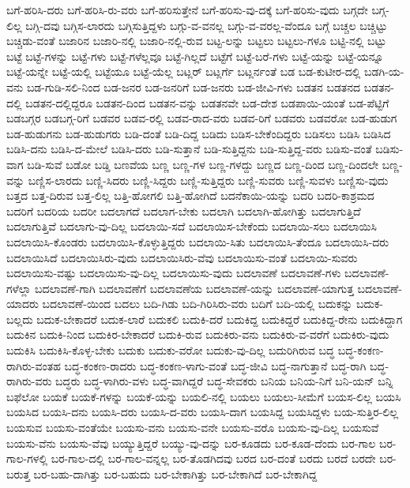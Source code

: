 {ಬಗೆ-ಹರಿಸಿ-ದರು
ಬಗೆ-ಹರಿಸಿ-ರು-ವರು
ಬಗೆ-ಹರಿಸುತ್ತೇನೆ
ಬಗೆ-ಹರಿಸು-ವು-ದಕ್ಕೆ
ಬಗೆ-ಹರಿಸು-ವುದು
ಬಗ್ಗದೇ
ಬಗ್ಗ-ಲಿಲ್ಲ
ಬಗ್ಗಿ-ದವು
ಬಗ್ಗಿಸ-ಲಾರದು
ಬಗ್ಗಿಸುತ್ತಿದ್ದಳು
ಬಗ್ಗು-ವ-ವನಲ್ಲ
ಬಗ್ಗು-ವ-ವರಲ್ಲ-ವೆಂದೂ
ಬಗ್ಗೆ
ಬಚ್ಚಲ
ಬಚ್ಚಿಟ್ಟು
ಬಚ್ಚಿಡು-ವಂತೆ
ಬಜಾರಿನ
ಬಜಾರಿ-ನಲ್ಲಿ
ಬಜಾರಿ-ನಲ್ಲಿ-ರುವ
ಬಟ್ಟ-ಲನ್ನು
ಬಟ್ಟಲು
ಬಟ್ಟಲು-ಗಳೂ
ಬಟ್ಟಿ-ನಲ್ಲಿ
ಬಟ್ಟು
ಬಟ್ಟೆ
ಬಟ್ಟೆ-ಗಳನ್ನು
ಬಟ್ಟೆ-ಗಳು
ಬಟ್ಟೆ-ಗಳೆಲ್ಲವೂ
ಬಟ್ಟೆ-ಗಿಲ್ಲದೆ
ಬಟ್ಟೆಗೆ
ಬಟ್ಟೆ-ಬರೆ-ಗಳು
ಬಟ್ಟೆ-ಯನ್ನು
ಬಟ್ಟೆ-ಯನ್ನೂ
ಬಟ್ಟೆ-ಯನ್ನೇ
ಬಟ್ಟೆ-ಯಲ್ಲಿ
ಬಟ್ಟೆಯೂ
ಬಟ್ಟೆ-ಯೆಲ್ಲ
ಬಟ್ಲರ್
ಬಟ್ಲರ್ಗೆ
ಬಟ್ಲರ್ನಂತೆ
ಬಡ
ಬಡ-ಕುಟೀರ-ದಲ್ಲಿ
ಬಡಗಿ-ಯ-ವನು
ಬಡ-ಗುಡಿ-ಸಲಿ-ನಿಂದ
ಬಡ-ಜನರ
ಬಡ-ಜನರಿಗೆ
ಬಡ-ಜನರು
ಬಡ-ಜೀವಿ-ಗಳು
ಬಡತನ
ಬಡತನದ
ಬಡತನ-ದಲ್ಲಿ
ಬಡತನ-ದಲ್ಲಿದ್ದರೂ
ಬಡತನ-ದಿಂದ
ಬಡತನ-ವನ್ನು
ಬಡತನವೇ
ಬಡ-ದೇಶ
ಬಡಪಾಯಿ-ಯಂತೆ
ಬಡ-ಪೆಟ್ಟಿಗೆ
ಬಡಬಗ್ಗರ
ಬಡಬಗ್ಗ-ರಿಗೆ
ಬಡವರ
ಬಡವ-ರಲ್ಲಿ
ಬಡವ-ರಾದ-ವರು
ಬಡವ-ರಿಗೆ
ಬಡವರು
ಬಡವರೋ
ಬಡ-ಹುಡುಗ
ಬಡ-ಹುಡುಗನು
ಬಡ-ಹುಡುಗರು
ಬಡಿ-ದಂತೆ
ಬಡಿ-ದಿದ್ದ
ಬಡಿದು
ಬಡಿಸ-ಬೇಕೆಂದಿದ್ದರು
ಬಡಿಸಲು
ಬಡಿಸಿ
ಬಡಿಸಿದ
ಬಡಿಸಿ-ದನು
ಬಡಿಸಿ-ದ-ಮೇಲೆ
ಬಡಿಸಿ-ದರು
ಬಡಿ-ಸುತ್ತಾನೆ
ಬಡಿ-ಸುತ್ತಿದ್ದನು
ಬಡಿ-ಸುತ್ತಿದ್ದ-ವರು
ಬಡಿಸು-ವಂತೆ
ಬಡಿಸು-ವಾಗ
ಬಡಿ-ಸುವೆ
ಬಡೋ
ಬಡ್ಡಿ
ಬಣವೆಯ
ಬಣ್ಣ
ಬಣ್ಣ-ಗಳ
ಬಣ್ಣ-ಗಳದ್ದು
ಬಣ್ಣದ
ಬಣ್ಣ-ದಿಂದ
ಬಣ್ಣ-ದಿಂದಲೇ
ಬಣ್ಣ-ವನ್ನು
ಬಣ್ಣಿಸ-ಲಾರದು
ಬಣ್ಣಿ-ಸಿದರು
ಬಣ್ಣಿ-ಸಿದ್ದರು
ಬಣ್ಣಿ-ಸುತ್ತಿದ್ದರು
ಬಣ್ಣಿ-ಸುವರು
ಬಣ್ಣಿ-ಸುವಳು
ಬಣ್ಣಿಸು-ವುದು
ಬತ್ತದ
ಬತ್ತ-ದಿರುವ
ಬತ್ತ-ಲಿಲ್ಲ
ಬತ್ತಿ-ಹೋಗಲಿ
ಬತ್ತಿ-ಹೋಗಿದೆ
ಬದನೆಕಾಯಿ-ಯನ್ನು
ಬದರಿ
ಬದರಿ-ಕಾಶ್ರಮದ
ಬದರಿಗೆ
ಬದರಿಯ
ಬದರೀ
ಬದಲಾಗದೆ
ಬದಲಾಗ-ಬೇಕು
ಬದಲಾಗಿ
ಬದಲಾಗಿ-ಹೋಗಿತ್ತು
ಬದಲಾಗುತ್ತಿದೆ
ಬದಲಾಗುತ್ತಿವೆ
ಬದಲಾಗು-ವು-ದಿಲ್ಲ
ಬದಲಾಯಿ-ಸದೆ
ಬದಲಾಯಿಸ-ಬೇಕೆಂದು
ಬದಲಾಯಿ-ಸಲು
ಬದಲಾಯಿಸಿ
ಬದಲಾಯಿಸಿ-ಕೊಂಡರು
ಬದಲಾಯಿಸಿ-ಕೊಳ್ಳುತ್ತಿದ್ದರು
ಬದಲಾಯಿ-ಸಿತು
ಬದಲಾಯಿಸಿ-ತೆಂದೂ
ಬದಲಾಯಿಸಿ-ದರು
ಬದಲಾಯಿಸಿದೆ
ಬದಲಾಯಿಸಿರು-ವುದು
ಬದಲಾಯಿಸಿರು-ವೆವು
ಬದಲಾಯಿಸು-ವಂತೆ
ಬದಲಾಯಿ-ಸುವರು
ಬದಲಾಯಿಸು-ವಷ್ಟು
ಬದಲಾಯಿಸು-ವು-ದಿಲ್ಲ
ಬದಲಾಯಿಸು-ವುದು
ಬದಲಾವಣೆ
ಬದಲಾವಣೆ-ಗಳು
ಬದಲಾವಣೆ-ಗಳೆಲ್ಲಾ
ಬದಲಾವಣೆ-ಗಾಗಿ
ಬದಲಾವಣೆಗೆ
ಬದಲಾವಣೆಯ
ಬದಲಾವಣೆ-ಯನ್ನು
ಬದಲಾವಣೆ-ಯಾಗುತ್ತ
ಬದಲಾವಣೆ-ಯಾದರು
ಬದಲಾವಣೆ-ಯಿಂದ
ಬದಲು
ಬದಿ-ಗಿಡು
ಬದಿ-ಗಿರಿಸಿರು-ವರು
ಬದಿಗೆ
ಬದಿ-ಯಲ್ಲಿ
ಬದುಕನ್ನು
ಬದುಕ-ಬಲ್ಲದು
ಬದುಕ-ಬೇಕಾದರೆ
ಬದುಕ-ಲಾರೆ
ಬದುಕಲಿ
ಬದುಕಿ-ದರೆ
ಬದುಕಿದ್ದ
ಬದುಕಿದ್ದರೆ
ಬದುಕಿದ್ದ-ರೇನು
ಬದುಕಿದ್ದಾಗ
ಬದುಕಿನ
ಬದುಕಿ-ನಿಂದ
ಬದುಕಿರ-ಬೇಕಾದರೆ
ಬದುಕಿ-ರುವ
ಬದುಕಿರು-ವನು
ಬದುಕಿರು-ವ-ವರೆಗೆ
ಬದುಕಿರು-ವುದು
ಬದುಕಿಸಿ
ಬದುಕಿಸಿ-ಕೊಳ್ಳ-ಬೇಕು
ಬದುಕು
ಬದುಕು-ವರೋ
ಬದುಕು-ವು-ದಿಲ್ಲ
ಬದುರಿಗಿರುವ
ಬದ್ಧ
ಬದ್ಧ-ಕಂಕಣ-ರಾಗಿರು-ವಂತಹ
ಬದ್ಧ-ಕಂಕಣ-ರಾದರು
ಬದ್ಧ-ಕಂಕಣ-ಳಾಗು-ವಂತೆ
ಬದ್ಧ-ಜೀವಿ
ಬದ್ಧ-ನಾಗುತ್ತಾನೆ
ಬದ್ಧ-ರಾಗಿ
ಬದ್ಧ-ರಾಗಿರು-ವರು
ಬದ್ಧರು
ಬದ್ಧ-ಳಾಗಿರು-ವಳು
ಬದ್ಧ-ವಾಗಿದ್ದರೆ
ಬದ್ಧ-ಸೇವಕರು
ಬನಿಯ
ಬನಿಯ-ನಿಗೆ
ಬನಿ-ಯನ್
ಬನ್ನಿ
ಬಫೆಲೋ
ಬಯಕೆ
ಬಯಕೆ-ಗಳನ್ನು
ಬಯಕೆ-ಯನ್ನು
ಬಯಲಿ-ನಲ್ಲಿ
ಬಯಲು
ಬಯಲು-ಸೀಮೆಗೆ
ಬಯಸ-ಲಿಲ್ಲ
ಬಯಸಿ
ಬಯಸಿದ
ಬಯಸಿ-ದನು
ಬಯಸಿ-ದರು
ಬಯಸಿ-ದ-ವರು
ಬಯಸಿ-ದಾಗ
ಬಯಸಿದ್ದ
ಬಯಸಿದ್ದಳು
ಬಯ-ಸುತ್ತಿರ-ಲಿಲ್ಲ
ಬಯಸುವ
ಬಯಸು-ವಂತೆಯೇ
ಬಯಸು-ವನು
ಬಯಸು-ವನೇ
ಬಯಸು-ವರೊ
ಬಯಸು-ವು-ದಿಲ್ಲ
ಬಯಸುವೆ
ಬಯಸು-ವೆನು
ಬಯಸು-ವೆವು
ಬಯ್ಯುತ್ತಿದ್ದರೆ
ಬಯ್ಯು-ವು-ದನ್ನು
ಬರ-ಕೂಡದು
ಬರ-ಕೂಡ-ದೆಂದು
ಬರ-ಗಾಲ
ಬರ-ಗಾಲ-ಗಳಲ್ಲಿ
ಬರ-ಗಾಲ-ದಲ್ಲಿ
ಬರ-ಗಾಲ-ವನ್ನಲ್ಲ
ಬರ-ತೊಡಗಿದವು
ಬರದ
ಬರ-ದಂತೆ
ಬರದು
ಬರದೆ
ಬರದೇ
ಬರ-ಬರುತ್ತ
ಬರ-ಬಹು-ದಾಗಿತ್ತು
ಬರ-ಬಹುದು
ಬರ-ಬೇಕಾಗಿತ್ತು
ಬರ-ಬೇಕಾಗಿದೆ
ಬರ-ಬೇಕಾಗಿದ್ದ
}
